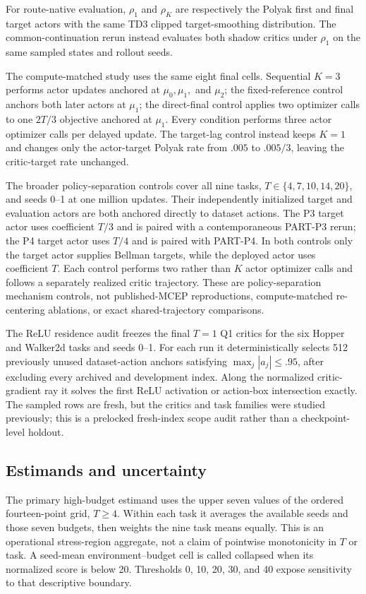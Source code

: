 \documentclass[twoside]{article}
\begin{document}
For route-native evaluation, $\rho_1$ and $\rho_K$ are respectively the Polyak first and final target actors with the same TD3 clipped target-smoothing distribution. The common-continuation rerun instead evaluates both shadow critics under $\rho_1$ on the same sampled states and rollout seeds.

The compute-matched study uses the same eight final cells. Sequential $K=3$ performs actor updates anchored at $\mu_0,\mu_1,$ and $\mu_2$; the fixed-reference control anchors both later actors at $\mu_1$; the direct-final control applies two optimizer calls to one $2T/3$ objective anchored at $\mu_1$. Every condition performs three actor optimizer calls per delayed update. The target-lag control instead keeps $K=1$ and changes only the actor-target Polyak rate from $.005$ to $.005/3$, leaving the critic-target rate unchanged.

The broader policy-separation controls cover all nine tasks,
$T\in\{4,7,10,14,20\}$, and seeds 0--1 at one million updates. Their
independently initialized target and evaluation actors are both anchored
directly to dataset actions. The P3 target actor uses coefficient $T/3$ and is
paired with a contemporaneous PART-P3 rerun; the P4 target actor uses $T/4$ and
is paired with PART-P4. In both controls only the target actor supplies Bellman
targets, while the deployed actor uses coefficient $T$. Each control performs
two rather than $K$ actor optimizer calls and follows a separately realized
critic trajectory. These are policy-separation mechanism controls, not
published-MCEP reproductions, compute-matched re-centering ablations, or exact
shared-trajectory comparisons.

The ReLU residence audit freezes the final $T=1$ Q1 critics for the six Hopper
and Walker2d tasks and seeds 0--1. For each run it deterministically selects
512 previously unused dataset-action anchors satisfying
$\max_j|a_j|\le .95$, after excluding every archived and development index.
Along the normalized critic-gradient ray it solves the first ReLU activation
or action-box intersection exactly. The sampled rows are fresh, but the
critics and task families were studied previously; this is a prelocked
fresh-index scope audit rather than a checkpoint-level holdout.

\subsection{Estimands and uncertainty}
The primary high-budget estimand uses the upper seven values of the ordered
fourteen-point grid, $T\ge4$. Within each task it averages the available seeds
and those seven budgets, then weights the nine task means equally. This is an
operational stress-region aggregate, not a claim of pointwise monotonicity in
$T$ or task. A seed-mean environment--budget cell is called collapsed when its
normalized score is below 20. Thresholds 0, 10, 20, 30, and 40 expose
sensitivity to that descriptive boundary.
\end{document}
